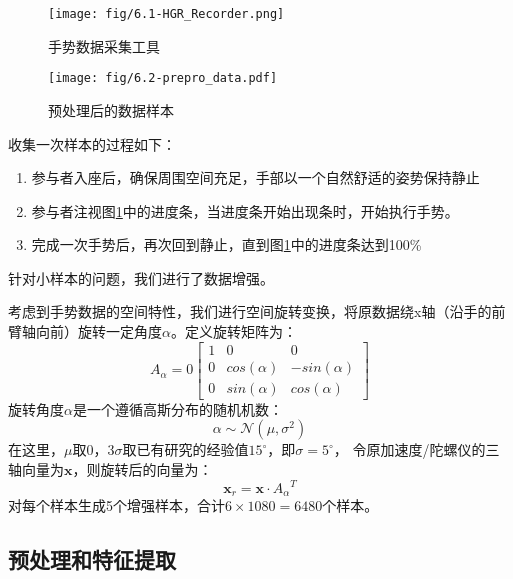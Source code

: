 \begin{figure}[t]
    \centering
    \texttt{[image: fig/6.1-HGR\_Recorder.png]}
    \caption{手势数据采集工具}
    \label{fig:HGR_Recorder}
\end{figure}

\begin{figure}[t]
    \centering
    \texttt{[image: fig/6.2-prepro\_data.pdf]}
    \caption{预处理后的数据样本}
    \label{fig:6.2-pre_pro_data}
\end{figure}

收集一次样本的过程如下：

\begin{enumerate}
    \item 参与者入座后，确保周围空间充足，手部以一个自然舒适的姿势保持静止
    \item 参与者注视图\ref{fig:HGR_Recorder}中的进度条，当进度条开始出现条时，开始执行手势。
    \item 完成一次手势后，再次回到静止，直到图\ref{fig:HGR_Recorder}中的进度条达到100\%
\end{enumerate}

针对小样本的问题，我们进行了数据增强。

考虑到手势数据的空间特性，我们进行空间旋转变换，将原数据绕x轴（沿手的前臂轴向前）旋转一定角度$\alpha$。定义旋转矩阵为：
$$
A_{\alpha} = 0
\begin{bmatrix}
  1 & 0 & 0\\
  0 & cos(\alpha) & -sin(\alpha)\\
  0& sin(\alpha) & cos(\alpha)
\end{bmatrix}
$$
旋转角度$\alpha$是一个遵循高斯分布的随机机数：
$$
\alpha \sim \mathcal{N}(\mu, \sigma^2)
$$
在这里，$\mu$取0，$3\sigma$取已有研究的经验值$15^\circ$\cites{d2020transformer}，即$\sigma=5^\circ$，
令原加速度/陀螺仪的三轴向量为$\bm{x}$，则旋转后的向量为：
$$
\bm{x}_r = \bm{x} \cdot {A_{\alpha}}^T
$$
对每个样本生成5个增强样本，合计$6 \times 1080 = 6480$个样本。

\subsection{预处理和特征提取}\label{ssec:feature_ext}


